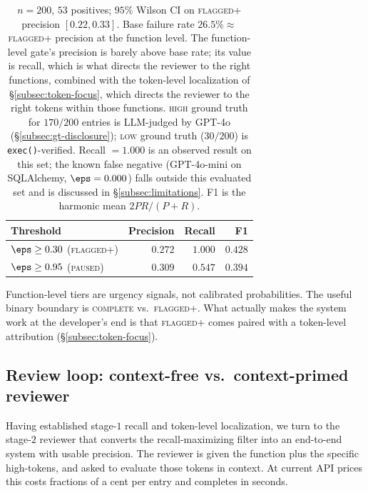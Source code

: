\begin{table}[h]
\centering
\small
\begin{tabular}{lrrr}
\toprule
Threshold & Precision & Recall & F1 \\
\midrule
$\eps \ge 0.30$ (\textsc{flagged+}) & $0.272$ & $\mathbf{1.000}$ & $0.428$ \\
$\eps \ge 0.95$ (\textsc{paused})   & $\mathbf{0.309}$ & $0.547$ & $0.394$ \\
\bottomrule
\end{tabular}
\caption{$n=200$, $53$ positives; $95\%$ Wilson CI on
\textsc{flagged+} precision $[0.22, 0.33]$. Base failure rate
$26.5\% \approx$ \textsc{flagged+} precision at the function level.
The function-level gate's precision is barely above base rate; its
value is recall, which is what directs the reviewer to the right
functions, combined with the token-level localization of
\S\ref{subsec:token-focus}, which directs the reviewer to the right
tokens within those functions. \textsc{high} ground truth for
$170/200$ entries is LLM-judged by GPT-4o
(\S\ref{subsec:gt-disclosure}); \textsc{low} ground truth ($30/200$)
is \texttt{exec()}-verified.
Recall $=1.000$ is an observed result on this set; the known false
negative (GPT-4o-mini on SQLAlchemy, $\eps=0.000$) falls outside
this evaluated set and is discussed in \S\ref{subsec:limitations}.
F1 is the harmonic mean $2PR/(P+R)$.}
\label{tab:pr}
\end{table}

Function-level tiers are urgency signals, not calibrated
probabilities. The useful binary boundary is \textsc{complete} vs.\
\textsc{flagged+}. What actually makes the system work at the
developer's end is that \textsc{flagged+} comes paired with a
token-level attribution (\S\ref{subsec:token-focus}).

\subsection{Review loop: context-free vs.\ context-primed reviewer}
\label{subsec:review-loop}

Having established stage-$1$ recall and token-level localization, we
turn to the stage-$2$ reviewer that converts the recall-maximizing
filter into an end-to-end system with usable precision. The reviewer
is given the function plus the specific high-\eps tokens, and asked
to evaluate those tokens in context. At current API prices this
costs fractions of a cent per entry and completes in seconds.

